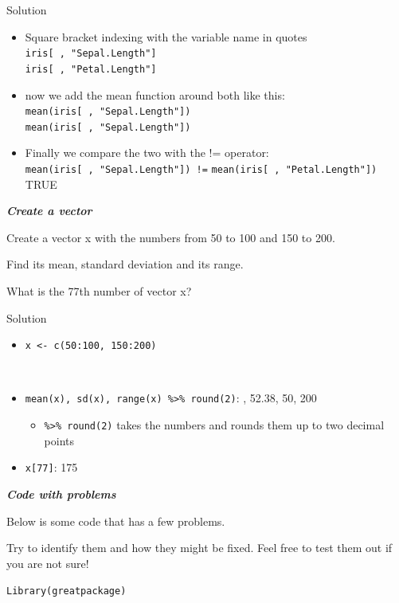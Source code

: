 \documentclass[
]{book}
\providecommand{\tightlist}{%
  \setlength{\itemsep}{0pt}\setlength{\parskip}{0pt}}
\begin{document}
Solution

\begin{itemize}
\tightlist
\item
  Square bracket indexing with the variable name in quotes \newline
  \texttt{iris{[}\ ,\ "Sepal.Length"{]}}\\
  \texttt{iris{[}\ ,\ "Petal.Length"{]}}
\item
  now we add the mean function around both like this:
  \texttt{mean(iris{[}\ ,\ "Sepal.Length"{]})}\\
  \texttt{mean(iris{[}\ ,\ "Sepal.Length"{]})}
\item
  Finally we compare the two with the != operator:
  \texttt{mean(iris{[}\ ,\ "Sepal.Length"{]})\ !=}
  \texttt{mean(iris{[}\ ,\ "Petal.Length"{]})}\\
  TRUE
\end{itemize}

\textbf{\emph{Create a vector}}

Create a vector x with the numbers from 50 to 100 and 150 to 200.

Find its mean, standard deviation and its range.

What is the 77th number of vector x?

Solution

\begin{itemize}
\tightlist
\item
  \texttt{x\ \textless{}-\ c(50:100,\ 150:200)}\strut \\
\item
  \texttt{mean(x),\ sd(x),\ range(x)\ \%\textgreater{}\%\ round(2)}: , 52.38, 50, 200

  \begin{itemize}
  \tightlist
  \item
    \texttt{\%\textgreater{}\%\ round(2)} takes the numbers and rounds them up to two decimal points
  \end{itemize}
\item
  \texttt{x{[}77{]}}: 175
\end{itemize}

\textbf{\emph{Code with problems}}

Below is some code that has a few problems.

Try to identify them and how they might be fixed. Feel free to test them out if you are not sure!

\texttt{Library(greatpackage)}
\end{document}
